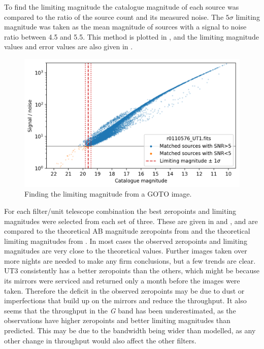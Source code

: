 \begin{colsection}
\begin{colsection}
To find the limiting magnitude the catalogue magnitude of each source was compared to the ratio of the source count and its measured noise. The $5\sigma$ limiting magnitude was taken as the mean magnitude of sources with a signal to noise ratio between 4.5 and 5.5. This method is plotted in , and the limiting magnitude values and error values are also given in .

\newpage

\begin{figure}[t]
    \begin{center}
        \includegraphics[width=\textwidth]{images/throughput/limiting_mag_real.png}
    \end{center}
    \caption[Finding the limiting magnitude from a GOTO image]{
        Finding the limiting magnitude from a GOTO image.
    }\label{fig:lim_mag}
\end{figure}

For each filter/unit telescope combination the best zeropoints and limiting magnitudes were selected from each set of three. These are given in  and , and are compared to the theoretical AB magnitude zeropoints from  and the theoretical limiting magnitudes from . In most cases the observed zeropoints and limiting magnitudes are very close to the theoretical values. Further images taken over more nights are needed to make any firm conclusions, but a few trends are clear. UT3 consistently has a better zeropoints than the others, which might be because its mirrors were serviced and returned only a month before the images were taken. Therefore the deficit in the observed zeropoints may be due to dust or imperfections that build up on the mirrors and reduce the throughput. It also seems that the throughput in the \textit{G} band has been underestimated, as the observations have higher zeropoints and better limiting magnitudes than predicted. This may be due to the bandwidth being wider than modelled, as any other change in throughput would also affect the other filters.


\end{colsection}
\end{colsection}
